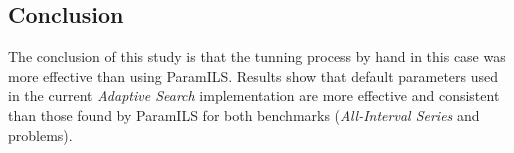 %
%
%
%
%

\subsection{Conclusion}

The conclusion of this study is that the tunning process by hand in this case was more effective than using {\sc ParamILS}. Results show that default parameters used in the current {\it Adaptive Search} implementation are more effective and consistent than those found by {\sc ParamILS} for both benchmarks ({\it All-Interval Series} and \carr{} problems).